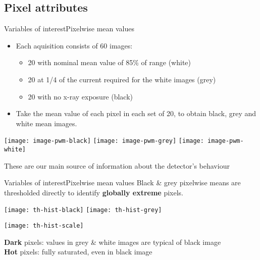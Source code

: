 \documentclass[8pt]{beamer}
\begin{document}

\subsection{Pixel attributes}

\begin{frame}{Variables of interest}{Pixelwise mean values}
	\begin{itemize}
		\item Each aquisition consists of 60 images:
		\begin{itemize}
			\item 20 with nominal mean value of 85\% of range (white)
			\item 20 at 1/4 of the current required for the white images (grey)
			\item 20 with no x-ray exposure (black)
		\end{itemize}
		\item Take the mean value of each pixel in each set of 20, to obtain black, grey and white mean images. 
	\end{itemize}
	
	\begin{center}
		\texttt{[image: image-pwm-black]}
		\texttt{[image: image-pwm-grey]}
		\texttt{[image: image-pwm-white]}
	\end{center}
	These are our main source of information about the detector's behaviour
\end{frame}


\begin{frame}{Variables of interest}{Pixelwise mean values}
	Black \& grey pixelwise means are thresholded directly to identify \textbf{globally extreme} pixels.
	\vspace{-12pt}
	\begin{center}
		\texttt{[image: th-hist-black]}
		\texttt{[image: th-hist-grey]}
		
		\texttt{[image: th-hist-scale]}
	\end{center}
	
	\textbf{Dark} pixels: values in grey \& white images are typical of black image\\
	\textbf{Hot} pixels: fully saturated, even in black image

\end{frame}
	
\end{document}

